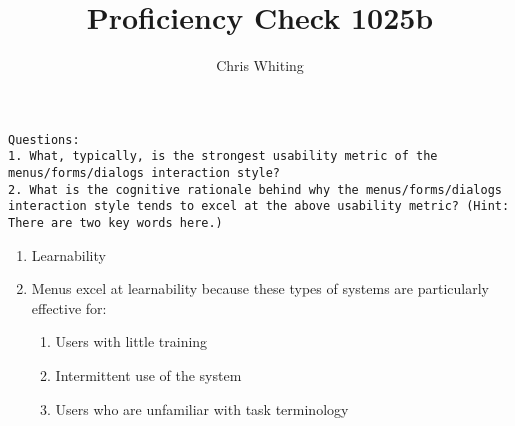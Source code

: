\documentclass[11pt]{article}
\title{Proficiency Check 1025b}
\author{Chris Whiting}
\begin{document}
\maketitle

 
\begin{verbatim}
Questions:
1. What, typically, is the strongest usability metric of the menus/forms/dialogs interaction style?
2. What is the cognitive rationale behind why the menus/forms/dialogs interaction style tends to excel at the above usability metric? (Hint: There are two key words here.)
\end{verbatim}

\begin{enumerate}
\item
 Learnability 

\item
Menus excel at learnability because these types of systems are particularly effective for:
\begin{enumerate}
\item
Users with little training
\item
Intermittent use of the system
\item
Users who are unfamiliar with task terminology
\end{enumerate}

\end{enumerate}
\end{document}

